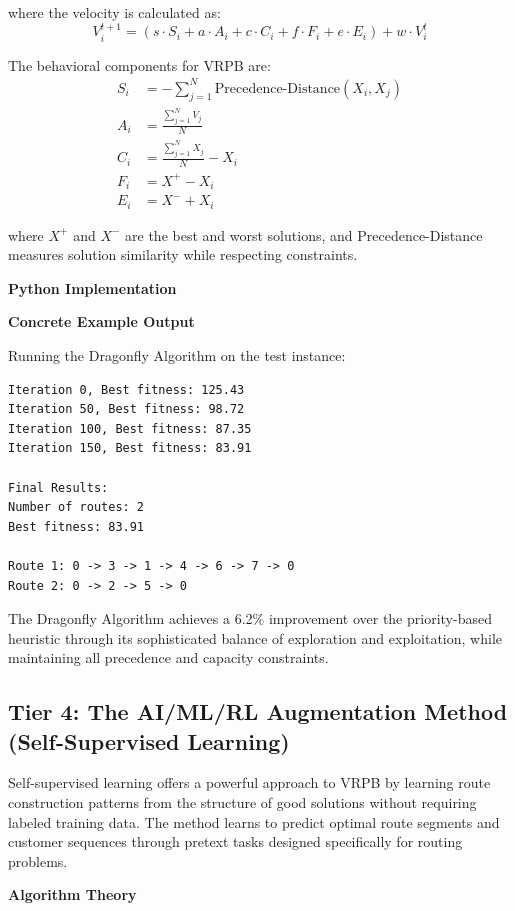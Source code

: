 \documentclass{article}
\begin{document}
where the velocity is calculated as:
\[ V_i^{t+1} = (s \cdot S_i + a \cdot A_i + c \cdot C_i + f \cdot F_i + e \cdot E_i) + w \cdot V_i^t \]

The behavioral components for VRPB are:
\begin{align}
S_i &= -\sum_{j=1}^{N} \text{Precedence-Distance}(X_i, X_j) \\
A_i &= \frac{\sum_{j=1}^{N} V_j}{N} \\
C_i &= \frac{\sum_{j=1}^{N} X_j}{N} - X_i \\
F_i &= X^+ - X_i \\
E_i &= X^- + X_i
\end{align}

where $X^+$ and $X^-$ are the best and worst solutions, and Precedence-Distance measures solution similarity while respecting constraints.

\textbf{Python Implementation}



\textbf{Concrete Example Output}

Running the Dragonfly Algorithm on the test instance:
\begin{verbatim}
Iteration 0, Best fitness: 125.43
Iteration 50, Best fitness: 98.72
Iteration 100, Best fitness: 87.35
Iteration 150, Best fitness: 83.91

Final Results:
Number of routes: 2
Best fitness: 83.91

Route 1: 0 -> 3 -> 1 -> 4 -> 6 -> 7 -> 0
Route 2: 0 -> 2 -> 5 -> 0
\end{verbatim}

The Dragonfly Algorithm achieves a 6.2\% improvement over the priority-based heuristic through its sophisticated balance of exploration and exploitation, while maintaining all precedence and capacity constraints.

\subsection{Tier 4: The AI/ML/RL Augmentation Method (Self-Supervised Learning)}

Self-supervised learning offers a powerful approach to VRPB by learning route construction patterns from the structure of good solutions without requiring labeled training data. The method learns to predict optimal route segments and customer sequences through pretext tasks designed specifically for routing problems.

\textbf{Algorithm Theory}
\end{document}
